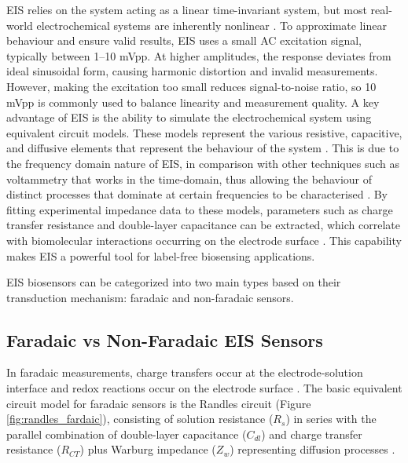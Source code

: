 \Ac{EIS} relies on the system acting as a linear time-invariant system, but most real-world electrochemical systems are inherently nonlinear \cite{lazanasErratumElectrochemicalImpedance2025}. To approximate linear behaviour and ensure valid results, EIS uses a small AC excitation signal, typically between 1–10 mVpp\cite{EISQualityIndicators}\cite{lazanasErratumElectrochemicalImpedance2025}. At higher amplitudes, the response deviates from ideal sinusoidal form, causing harmonic distortion and invalid measurements. However, making the excitation too small reduces signal-to-noise ratio, so 10 mVpp is commonly used to balance linearity and measurement quality.  
A key advantage of \ac{EIS} is the ability to simulate the electrochemical system using equivalent circuit models. These models represent the various resistive, capacitive, and diffusive elements that represent the behaviour of the system \cite{lazanasErratumElectrochemicalImpedance2025}. This is due to the frequency domain nature of EIS, in comparison with other techniques such as voltammetry that works in the time-domain, thus allowing the behaviour of distinct processes that dominate at certain frequencies to be characterised \cite{lazanasErratumElectrochemicalImpedance2025}. By fitting experimental impedance data to these models, parameters such as charge transfer resistance and double-layer capacitance can be extracted, which correlate with biomolecular interactions occurring on the electrode surface \cite{danielsLabelFreeImpedanceBiosensors2007}. This capability makes \ac{EIS} a powerful tool for label-free biosensing applications. 

EIS biosensors can be categorized into two main types based on their transduction mechanism: faradaic and non-faradaic sensors.

\subsection{Faradaic vs Non-Faradaic EIS Sensors}
In faradaic measurements, charge transfers occur at the electrode-solution interface and redox reactions occur on the electrode surface \cite{xieReviewAdvancementsNanoscale2020a}. The basic equivalent circuit model for faradaic sensors is the Randles circuit (Figure \ref{fig:randles_fardaic}), consisting of solution resistance ($R_s$) in series with the parallel combination of double-layer capacitance ($C_{dl}$) and charge transfer resistance ($R_{CT}$) plus Warburg impedance ($Z_w$) representing diffusion processes \cite{xieReviewAdvancementsNanoscale2020a}.

